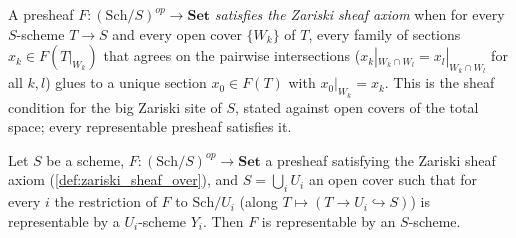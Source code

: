 \begin{definition}
  \label{def:zariski_sheaf_over}
  A presheaf \(F : (\mathrm{Sch}/S)^{op} \to \mathbf{Set}\) \emph{satisfies
  the Zariski sheaf axiom} when for every \(S\)-scheme \(T \to S\) and every
  open cover \(\{W_k\}\) of \(T\), every family of sections
  \(x_k \in F(T|_{W_k})\) that agrees on the pairwise intersections
  (\(x_k|_{W_k \cap W_l} = x_l|_{W_k \cap W_l}\) for all \(k, l\)) glues to a
  unique section \(x_0 \in F(T)\) with \(x_0|_{W_k} = x_k\).  This is the
  sheaf condition for the big Zariski site of \(S\), stated against open
  covers of the total space; every representable presheaf satisfies it.
\end{definition}

\begin{theorem}
  \label{thm:representability_zariski_descent}
  Let \(S\) be a scheme, \(F : (\mathrm{Sch}/S)^{op} \to \mathbf{Set}\) a
  presheaf satisfying the Zariski sheaf axiom
  (\cref{def:zariski_sheaf_over}), and \(S = \bigcup_i U_i\) an open cover
  such that for every \(i\) the restriction of \(F\) to
  \(\mathrm{Sch}/U_i\) (along \(T \mapsto (T \to U_i \hookrightarrow S)\))
  is representable by a \(U_i\)-scheme \(Y_i\).  Then \(F\) is representable
  by an \(S\)-scheme.
\end{theorem}

